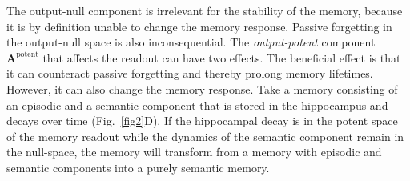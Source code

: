 The output-null component is irrelevant for the stability of the memory, because it is by definition unable to change the memory response. Passive forgetting in the output-null space is also inconsequential. The \emph{output-potent} component~$\mathbf{A}^\text{potent}$ that affects the readout can have two effects. The beneficial effect is that it can counteract passive forgetting and thereby prolong memory lifetimes. However, it can also change the memory response. Take a memory consisting of an episodic and a semantic component that is stored in the hippocampus and decays over time (Fig.~\ref{fig2}D). If the hippocampal decay is in the potent space of the memory readout while the dynamics of the semantic component remain in the null-space, the memory will transform from a memory with episodic and semantic components into a purely semantic memory.


